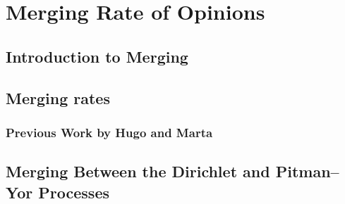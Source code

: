 \chapter{Merging Rate of Opinions}

\section{Introduction to Merging}
\section{Merging rates}
\subsection{Previous Work by Hugo and Marta}
\section{Merging Between the Dirichlet and Pitman--Yor Processes}